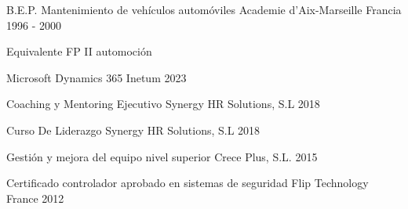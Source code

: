 
    \begin{cventries}

      \cventry
        {B.E.P. Mantenimiento de vehículos automóviles} %
        {Academie d’Aix-Marseille} %
        {Francia} %
        {1996 - 2000} %
        {
          \begin{cvitems} %
            \item {Equivalente FP II automoción}
          \end{cvitems}
        }
    
    \end{cventries}


    \begin{cvhonors}

      \cvhonor
        {Microsoft Dynamics 365}
        {Inetum}
        {}
        {2023}

      \cvhonor
        {Coaching y Mentoring Ejecutivo}
        {Synergy HR Solutions, S.L}
        {}
        {2018}
      
      \cvhonor
        {Curso De Liderazgo}
        {Synergy HR Solutions, S.L}
        {}
        {2018}

      \cvhonor
        {Gestión y mejora del equipo nivel superior}
        {Crece Plus, S.L.}
        {}
        {2015}

      \cvhonor
        {Certificado controlador aprobado en sistemas de seguridad}
        {Flip Technology France}
        {}
        {2012}
    
    \end{cvhonors}
